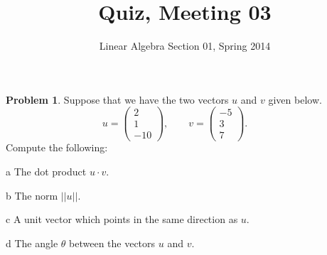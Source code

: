 \documentclass[11pt]{amsart}
\theoremstyle{definition}
\newtheorem{problem}{Problem}
\begin{document}
\title{Quiz, Meeting 03}
\author{Linear Algebra Section 01, Spring 2014}

\maketitle

\begin{problem}
Suppose that we have the two vectors $u$ and $v$ given below.
\[
u = \begin{pmatrix} 2 \\ 1 \\ -10 \end{pmatrix}, \qquad
v = \begin{pmatrix} -5 \\ 3 \\ 7\end{pmatrix}. \qquad
\]
Compute the following:
\begin{compactdesc}
\item[a] The dot product $u\cdot v$.
\item[b] The norm $||u||$.
\item[c] A unit vector which points in the same direction as $u$.
\item[d] The angle $\theta$ between the vectors $u$ and $v$.
\end{compactdesc}



\end{problem}


\vfill
\end{document}
